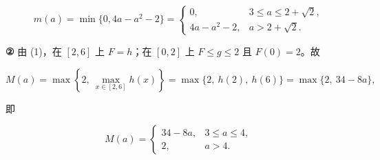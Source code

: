 \begin{answer}
\nopagebreak[4]
\[
m(a)=\min\{0,4a-a^{2}-2\}=\begin{cases}
0, & 3\leqslant a\leqslant 2+\sqrt{2}, \\
4a-a^{2}-2, & a>2+\sqrt{2}.
\end{cases}
\]

\textbf{②} 由 (1)，在 \([2,6]\) 上 \(F=h\)；在 \([0,2]\) 上 \(F\leqslant g\leqslant 2\) 且 \(F(0)=2\)。故

\nopagebreak[4]
\[
M(a)=\max\left\{2,\ \max_{x\in[2,6]}h(x)\right\}=\max\{2,\ h(2),\ h(6)\}=\max\{2,\ 34-8a\},
\]

即

\nopagebreak[4]
\[
M(a)=\begin{cases}
34-8a, & 3\leqslant a\leqslant 4, \\
2, & a>4.
\end{cases}
\]



\end{answer}
